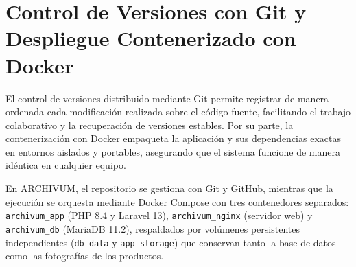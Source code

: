 \section{Control de Versiones con Git y Despliegue Contenerizado con Docker}
El control de versiones distribuido mediante Git permite registrar de manera ordenada cada modificación realizada sobre el código fuente, facilitando el trabajo colaborativo y la recuperación de versiones estables. Por su parte, la contenerización con Docker empaqueta la aplicación y sus dependencias exactas en entornos aislados y portables, asegurando que el sistema funcione de manera idéntica en cualquier equipo.

En ARCHIVUM, el repositorio se gestiona con Git y GitHub, mientras que la ejecución se orquesta mediante Docker Compose con tres contenedores separados: \texttt{archivum\_app} (PHP 8.4 y Laravel 13), \texttt{archivum\_nginx} (servidor web) y \texttt{archivum\_db} (MariaDB 11.2), respaldados por volúmenes persistentes independientes (\texttt{db\_data} y \texttt{app\_storage}) que conservan tanto la base de datos como las fotografías de los productos.
